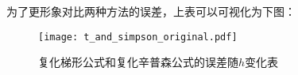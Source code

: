 
为了更形象对比两种方法的误差，上表可以可视化为下图：

\begin{figure}[!htp]
    \centering
    \texttt{[image: t\_and\_simpson\_original.pdf]} \\
    \caption{复化梯形公式和复化辛普森公式的误差随$h$变化表}
    \label{fig:t_and_simpson_R}
\end{figure}


